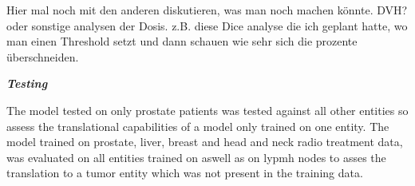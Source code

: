 Hier mal noch mit den anderen diskutieren, was man noch machen könnte. DVH? oder sonstige analysen der Dosis. z.B. diese Dice analyse die ich geplant hatte, wo man einen Threshold setzt und dann schauen wie sehr sich die prozente überschneiden.

\textbf{\emph{Testing}}

The model tested on only prostate patients was tested against all other entities so assess the translational capabilities of a model only trained on one entity. The model trained on prostate, liver, breast and head and neck radio treatment data, was evaluated on all entities trained on aswell as on lypmh nodes to asses the translation to a tumor entity which was not present in the training data. 






